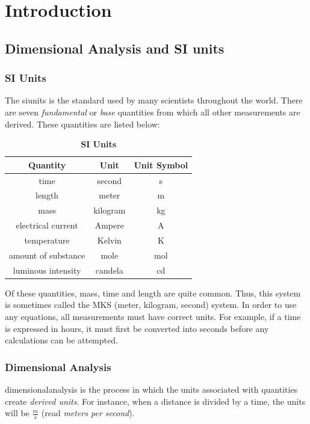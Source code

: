 \chapter{Introduction}
\section{Dimensional Analysis and SI units}
\subsection{SI Units}
The  \gls{siunits} is the standard used by many scientists throughout the world.  There are seven \textit{fundamental} or \textit{base} quantities from which all other measurements are derived.  These quantities are listed below:

\begin{center}

	
\begin{table}[ht]\caption{\textbf{SI Units}}%
	\centering %
	\begin{tabular}{|c|c|c|}
		\hline \hline
		\textbf{Quantity} & \textbf{Unit} & \textbf{Unit Symbol}\\
		\hline
		time & second & s \\
		\hline
		length & meter & m \\
		\hline
		mass & kilogram & kg \\
		\hline
		electrical current & Ampere & A \\
		\hline
		temperature & Kelvin & K \\
		\hline
		amount of substance & mole & mol \\
		\hline
		luminous intensity & candela & cd \\
		\hline		
	\end{tabular}
	\label{table:nonlin}%
\end{table}
\end{center}

	Of these quantities, mass, time and length are quite common.  Thus, this system is sometimes called the MKS (meter, kilogram, second) system. In order to use any equations, all measurements must have correct units.  For example, if a time is expressed in hours, it must first be converted into seconds before any calculations can be attempted.  
	
	\subsection{Dimensional Analysis}
	\gls{dimensionalanalysis}  is the process in which the units associated with quantities create \textit{derived units}.  For instance, when a distance is divided by a time, the units will be $ \frac{m}{s}$ (read \textit{meters per second}).  	
	
